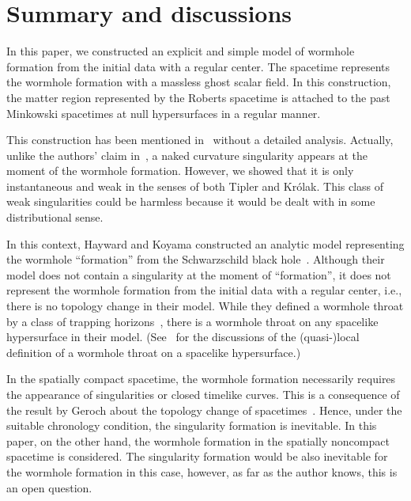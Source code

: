 \documentclass[aps,prd,twocolumn,eqsecnum,showpacs,amsmath]{revtex4}
\begin{document}


\section{Summary and discussions}
In this paper, we constructed an explicit and simple model of wormhole formation from the initial data with a regular center.
The spacetime represents the wormhole formation with a massless ghost scalar field.
In this construction, the matter region represented by the Roberts spacetime is attached to the past Minkowski spacetimes at null hypersurfaces in a regular manner.

This construction has been mentioned in~\cite{fj2004} without a detailed analysis.
Actually, unlike the authors' claim in~\cite{fj2004}, a naked curvature singularity appears at the moment of the wormhole formation. 
However, we showed that it is only instantaneous and weak in the senses of both Tipler and Kr\'{o}lak.
This class of weak singularities could be harmless because it would be dealt with in some distributional sense.

In this context, Hayward and Koyama constructed an analytic model representing the wormhole ``formation'' from the Schwarzschild black hole~\cite{kh2004}.
Although their model does not contain a singularity at the moment of ``formation'', it does not represent the wormhole formation from the initial data with a regular center, i.e., there is no topology change in their model.
While they defined a wormhole throat by a class of trapping horizons~\cite{hayward1999,hv1998}, there is a wormhole throat on any spacelike hypersurface in their model.
(See~\cite{mhc2009} for the discussions of the (quasi-)local definition of a wormhole throat on a spacelike hypersurface.)

In the spatially compact spacetime, the wormhole formation necessarily requires the appearance of singularities or closed timelike curves.
This is a consequence of the result by Geroch about the topology change of spacetimes~\cite{geroch1967}.
Hence, under the suitable chronology condition, the singularity formation is inevitable.
In this paper, on the other hand, the wormhole formation in the spatially noncompact spacetime is considered.
The singularity formation would be also inevitable for the wormhole formation in this case, however, as far as the author knows, this is an open question.
\end{document}
